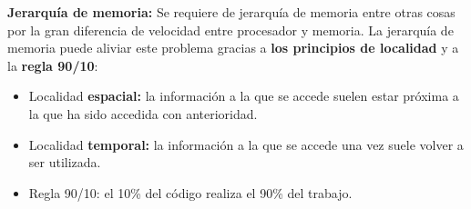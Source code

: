 \documentclass{article}
\begin{document}
\textbf{Jerarquía de memoria:} Se requiere de jerarquía de memoria entre otras cosas por la gran diferencia de velocidad entre procesador y memoria. La jerarquía de memoria puede aliviar este problema gracias a \textbf{los principios de localidad} y a la \textbf{regla 90/10}:
\begin{itemize}
\item Localidad \textbf{espacial:} la información a la que se accede suelen estar próxima a la que ha sido accedida con anterioridad.

\item Localidad \textbf{temporal:} la información a la que se accede una vez suele volver a ser utilizada.

\item Regla 90/10: el 10\% del código realiza el 90\% del trabajo.
\end{itemize}
\end{document}
